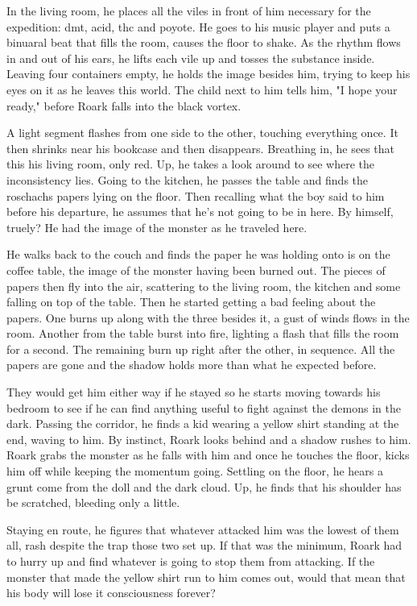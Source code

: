         In the living room, he places all the viles in front of him necessary for the expedition: dmt, acid, thc and poyote. He goes to his
    music player and puts a binuaral beat that fills the room, causes the floor to shake. As the rhythm flows in and out of his ears, he 
    lifts each vile up and tosses the substance inside. Leaving four containers empty, he holds the image besides him, trying to keep his eyes
    on it as he leaves this world. The child next to him tells him, "I hope your ready," before Roark falls into the black vortex.

        A light segment flashes from one side to the other, touching everything once. It then shrinks near his bookcase and then disappears. 
    Breathing in, he sees that this his living room, only red. Up, he takes a look around to see where the inconsistency lies. Going to the
    kitchen, he passes the table and finds the roschachs papers lying on the floor. Then recalling what the boy said to him before his departure,
    he assumes that he's not going to be in here. By himself, truely? He had the image of the monster as he traveled here. 

        He walks back to the couch and finds the paper he was holding onto is on the coffee table, the image of the monster having been burned
    out. The pieces of papers then fly into the air, scattering to the living room, the kitchen and some falling on top of the table. Then he
    started getting a bad feeling about the papers. One burns up along with the three besides it, a gust of winds flows in the room. Another
    from the table burst into fire, lighting a flash that fills the room for a second. The remaining burn up right after the other, in sequence.
    All the papers are gone and the shadow holds more than what he expected before.

        They would get him either way if he stayed so he starts moving towards his bedroom to see if he can find anything useful to fight against
    the demons in the dark. Passing the corridor, he finds a kid wearing a yellow shirt standing at the end, waving to him. By instinct, Roark
    looks behind and a shadow rushes to him. Roark grabs the monster as he falls with him and once he touches the floor, kicks him off while
    keeping the momentum going. Settling on the floor, he hears a grunt come from the doll and the dark cloud. Up, he finds that his shoulder
    has be scratched, bleeding only a little. 

        Staying en route, he figures that whatever attacked him was the lowest of them all, rash despite the trap those two set up. If that
    was the minimum, Roark had to hurry up and find whatever is going to stop them from attacking. If the monster that made the yellow shirt run
    to him comes out, would that mean that his body will lose it consciousness forever?

